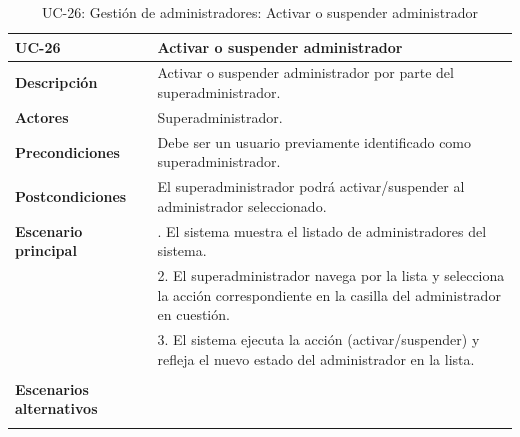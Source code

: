 \begin{table}[H]
  \begin{center}
    \begin{tabularx}{16.4cm}{|l|X|}
      \hline
      \textbf{UC-26} & \textbf{Activar o suspender administrador}\\
      \hline
      \textbf{Descripción} & Activar o suspender administrador por parte del superadministrador. \\
      \hline
      \textbf{Actores} & Superadministrador.\\
      \hline
      \textbf{Precondiciones} & Debe ser un usuario previamente identificado como superadministrador.\\
      \hline
      \textbf{Postcondiciones} & El superadministrador podrá activar/suspender al administrador seleccionado.\\
      \hline
      \textbf{Escenario principal} & \smallskip 1. El sistema muestra el listado de administradores del sistema.\\
      & 2. El superadministrador navega por la lista y selecciona la acción correspondiente en la casilla del administrador en cuestión.\\
      & 3. El sistema ejecuta la acción (activar/suspender) y refleja el nuevo estado del administrador en la lista. \\
      & \\
      \hline
      \textbf{Escenarios alternativos} & \\
      & \\
      \hline
    \end{tabularx}
    \caption{UC-26: Gestión de administradores: Activar o suspender administrador}
    \label{tab:CU-activar-suspender-admin}
  \end{center}
\end{table}



